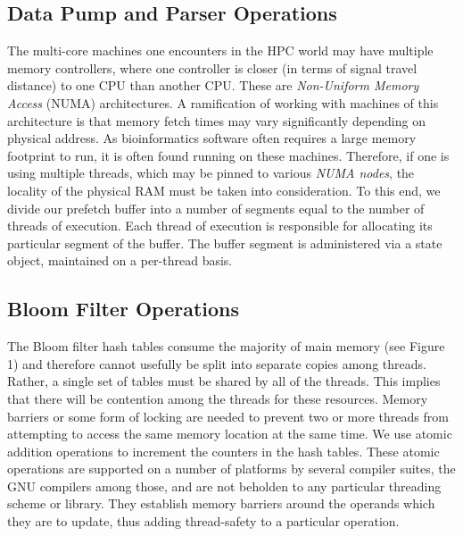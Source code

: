 \documentclass{article}
\begin{document}
\subsection{Data Pump and Parser Operations}

The multi-core machines one encounters in the HPC world may have multiple
memory controllers, where one controller is closer (in terms of signal travel
distance) to one CPU than another CPU. These are \textit{Non-Uniform Memory
Access} (NUMA) architectures. A ramification of working with machines of this
architecture is that memory fetch times may vary significantly depending on
physical address. As bioinformatics software often requires a large memory
footprint to run, it is often found running on these machines. Therefore, if
one is using multiple threads, which may be pinned to various \textit{NUMA
nodes}, the locality of the physical RAM must be taken into consideration. To
this end, we divide our prefetch buffer into a number of segments equal to the
number of threads of execution. Each thread of execution is responsible for
allocating its particular segment of the buffer. The buffer segment is
administered via a state object, maintained on a per-thread basis.

\subsection{Bloom Filter Operations}

The Bloom filter hash tables consume the majority of main memory (see Figure 1) and therefore cannot usefully be split into separate copies among
threads. Rather, a single set of tables must be shared by all of the threads.
This implies that there will be contention among the threads for these
resources. Memory barriers \cite{web:membar} or some form of locking are
needed to prevent two or more threads from attempting to access the same memory
location at the same time. We use atomic addition operations to increment the
counters in the hash tables. These atomic operations \cite{web:atomics} are
supported on a number of platforms by several compiler suites, the GNU
compilers among those, and are not beholden to any particular threading scheme
or library. They establish memory barriers around the operands which they are
to update, thus adding thread-safety to a particular operation.
\end{document}
